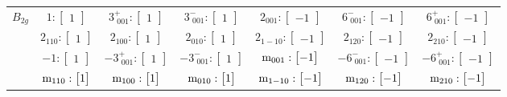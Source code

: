 \documentclass[fleqn,8pt,landscape]{jsarticle}
\begin{document}
\begin{longtable}{ccccccc}
$ B_{2g} $ & $ 1:\begin{bmatrix} 1 \end{bmatrix} $ & $ 3^{+}_{\,\,001}:\begin{bmatrix} 1 \end{bmatrix} $ & $ 3^{-}_{\,\,001}:\begin{bmatrix} 1 \end{bmatrix} $ & $ 2{}_{001}:\begin{bmatrix} -1 \end{bmatrix} $ & $ 6^{-}_{\,\,001}:\begin{bmatrix} -1 \end{bmatrix} $ & $ 6^{+}_{\,\,001}:\begin{bmatrix} -1 \end{bmatrix} $ \\
& $ 2{}_{110}:\begin{bmatrix} 1 \end{bmatrix} $ & $ 2{}_{100}:\begin{bmatrix} 1 \end{bmatrix} $ & $ 2{}_{010}:\begin{bmatrix} 1 \end{bmatrix} $ & $ 2{}_{1-10}:\begin{bmatrix} -1 \end{bmatrix} $ & $ 2{}_{120}:\begin{bmatrix} -1 \end{bmatrix} $ & $ 2{}_{210}:\begin{bmatrix} -1 \end{bmatrix} $ \\
& $ -1:\begin{bmatrix} 1 \end{bmatrix} $ & $ -3^{+}_{\,\,001}:\begin{bmatrix} 1 \end{bmatrix} $ & $ -3^{-}_{\,\,001}:\begin{bmatrix} 1 \end{bmatrix} $ & $ {\rm m}_{001}:\begin{bmatrix} -1 \end{bmatrix} $ & $ -6^{-}_{\,\,001}:\begin{bmatrix} -1 \end{bmatrix} $ & $ -6^{+}_{\,\,001}:\begin{bmatrix} -1 \end{bmatrix} $ \\
& $ {\rm m}_{110}:\begin{bmatrix} 1 \end{bmatrix} $ & $ {\rm m}_{100}:\begin{bmatrix} 1 \end{bmatrix} $ & $ {\rm m}_{010}:\begin{bmatrix} 1 \end{bmatrix} $ & $ {\rm m}_{1-10}:\begin{bmatrix} -1 \end{bmatrix} $ & $ {\rm m}_{120}:\begin{bmatrix} -1 \end{bmatrix} $ & $ {\rm m}_{210}:\begin{bmatrix} -1 \end{bmatrix} $ \\ \hline

\end{longtable}
\end{document}
